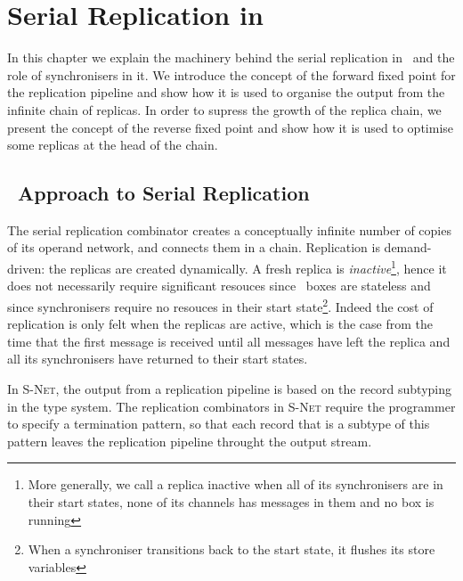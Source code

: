 \chapter{Serial Replication in \ak\ }\label{chap_sr}
In this chapter we explain the machinery behind the serial replication in \ak\ and the role of synchronisers in it. We introduce the concept of the forward fixed point for the replication pipeline and show how it is used to organise the output from the infinite chain of replicas. In order to supress the growth of the replica chain, we present the concept of the reverse fixed point and show how it is used to optimise some replicas at the head of the chain.


    \section{\ak\ Approach to Serial Replication}
The serial replication combinator creates a conceptually infinite number of copies of its operand network, and connects them in a chain. Replication is demand-driven: the replicas are created dynamically. A fresh replica is \emph{inactive}\footnote{More generally, we call a replica inactive when all of its synchronisers are in their start states, none of its channels has messages in them and no box is running}, hence it does not necessarily require significant resouces since \ak\ boxes are stateless and since synchronisers require no resouces in their start state\footnote{When a synchroniser transitions back to the start state, it flushes its store variables}. Indeed the cost of replication is only felt when the replicas are active, which is the case from the time that the first message is received until all messages have left the replica and all its synchronisers have returned to their start states.

In \textsc{S-Net}, the output from a replication pipeline is based on the record subtyping in the type system. The replication combinators in \textsc{S-Net} require the programmer to specify a termination pattern, so that each record that is a subtype of this pattern leaves the replication pipeline throught the output stream.

